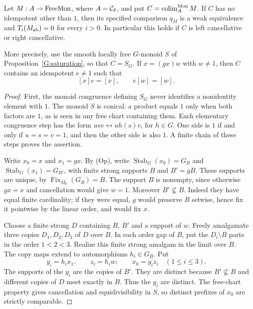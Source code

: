\begin{proposition}\label{G:idempotent}
Let $M:A\to\mathrm{FreeMon}$, where $A=\mathcal C_\delta$, and put
$C=\operatorname*{colim}_A^{\mathrm{Mon}}M$.  If $C$ has no idempotent other than $1$,
then its specified comparison $q_M$ is a weak equivalence and
$T_i(M_{\mathrm{ab}})=0$ for every $i>0$.  In particular this holds if
$C$ is left cancellative or right cancellative.

More precisely, use the smooth locally free $G$-monoid $S$ of
Proposition~\ref{G:saturation}, so that $C=S_G$.  If
$x=(gx)w$ with $w\ne1$, then $C$ contains an idempotent $e\ne1$
such that
\[
 [x]e=[x],\qquad e[w]=[w].
 \tag{G.7}
\]
\end{proposition}
\begin{proof}
First, the monoid congruence defining $S_G$ never identifies a
nonidentity element with $1$.  The monoid $S$ is conical: a
product equals $1$ only when both factors are $1$, as is seen in
any free chart containing them.  Each elementary congruence
step has the form
$u s v\leftrightarrow u h(s)v$, for $h\in G$.
One side is $1$ if and only if $u=s=v=1$, and then the other
side is also $1$.  A finite chain of these steps proves the
assertion.

Write $x_0=x$ and $x_1=gx$.  By (Op), write
$\operatorname{Stab}_G(x_0)=G_B$ and
$\operatorname{Stab}_G(x_1)=G_{B'}$, with finite strong supports
$B$ and $B'=gB$.  These supports are unique, by
$\operatorname{Fix}_{M_0}(G_B)=B$.  The support $B$ is nonempty,
since otherwise $gx=x$ and cancellation would give $w=1$.
Moreover $B'\not\subseteq B$.  Indeed they have equal finite
cardinality; if they were equal, $g$ would preserve $B$ setwise,
hence fix it pointwise by the linear order, and would fix $x$.

Choose a finite strong $D$ containing $B$, $B'$ and a support
of $w$.  Freely amalgamate three copies $D_1,D_2,D_3$ of $D$
over $B$.  In each order gap of $B$, put the $D_i\setminus B$
parts in the order $1<2<3$.  Realize this finite strong amalgam
in the limit over $B$.  The copy maps extend to automorphisms
$h_i\in G_B$.  Put
\[
 y_i=h_i x_1,\qquad z_i=h_i w;
 \qquad x_0=y_i z_i\quad(1\le i\le3).
\]
The supports of the $y_i$ are the copies of $B'$.  They are
distinct because $B'\not\subseteq B$ and different copies of
$D$ meet exactly in $B$.  Thus the $y_i$ are distinct.  The
free-chart property gives cancellation and equidivisibility in
$S$, so distinct prefixes of $x_0$ are strictly comparable.


\end{proof}
